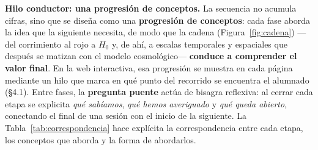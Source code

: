 \textbf{Hilo conductor: una progresión de conceptos.} La secuencia no acumula cifras, sino que se diseña como una \textbf{progresión de conceptos}: cada fase aborda la idea que la siguiente necesita, de modo que la cadena (Figura~\ref{fig:cadena}) ---del corrimiento al rojo a $H_{0}$ y, de ahí, a escalas temporales y espaciales que después se matizan con el modelo cosmológico--- \textbf{conduce a comprender el valor final}. En la web interactiva, esa progresión se muestra en cada página mediante un hilo que marca en qué punto del recorrido se encuentra el alumnado (§4.1). Entre fases, la \textbf{pregunta puente} actúa de bisagra reflexiva: al cerrar cada etapa se explicita \textit{qué sabíamos}, \textit{qué hemos averiguado} y \textit{qué queda abierto}, conectando el final de una sesión con el inicio de la siguiente. La Tabla~\ref{tab:correspondencia} hace explícita la correspondencia entre cada etapa, los conceptos que aborda y la forma de abordarlos.
